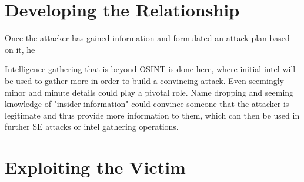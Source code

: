 \section{Developing the Relationship}
\begin{comment}
    
    - Engaging the target with the gathered info and fabricated pretext
    - Choosing the right timing
    - Practicing the engagement
    - Creating the strategy for engagement
    - Create a strategy, plan on how to exploit found weaknesses
    - Create a persona, a pretext with a convincing message
    - Choosing the right attack method
    - AI can help craft highly convincing messages, including the development of the persona (pretext)
    - Deepfake tech, chatbots etc
    - AI can analyze and predict the most suitable times and methods for an attack based on gathered intel

\end{comment}


Once the attacker has gained information and formulated an attack plan based on it, he 

Intelligence gathering that is beyond OSINT is done here, where initial intel will be used to gather more in order to build a convincing attack. Even seemingly minor and minute details could play a pivotal role. Name dropping and seeming knowledge of "insider information" could convince someone that the attacker is legitimate and thus provide more information to them, which can then be used in further SE attacks or intel gathering operations.

 





\section{Exploiting the Victim}
\begin{comment}
    
    - 

\end{comment}












